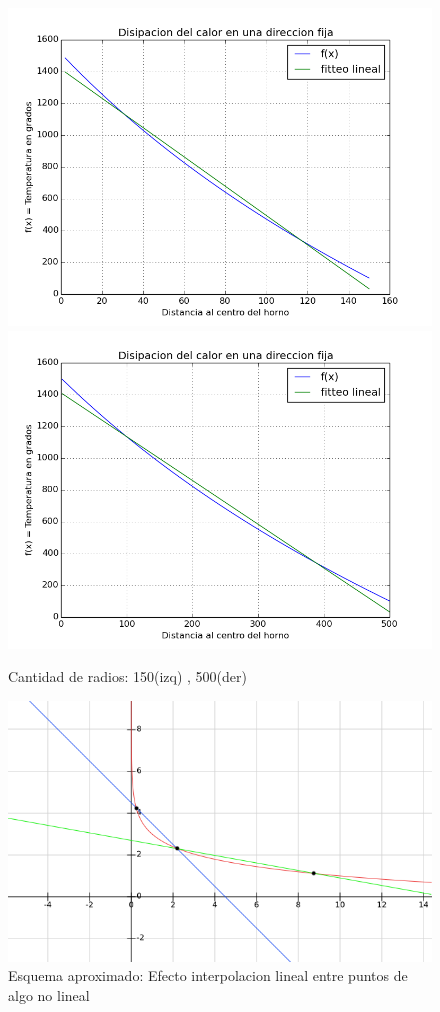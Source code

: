 \begin{figure}[h]
\centering
\includegraphics[scale=0.34]{funcion_temp_150_radios_ti_1500_te_102.png}
\includegraphics[scale=0.34]{funcion_temp_500_radios_ti_1500_te_102.png}
\caption{Cantidad de radios: 150(izq) , 500(der)}
\end{figure}
\FloatBarrier

\begin{figure}[h]\label{aprox}
\centering
\includegraphics[scale=0.8]{efecto_interpolacion_lineal.png}
\caption{Esquema aproximado: Efecto interpolacion lineal entre puntos de algo no lineal}
\end{figure}
\FloatBarrier

